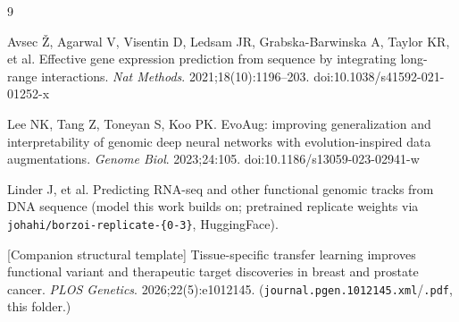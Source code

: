 \documentclass[10pt]{article}
\begin{document}
\begin{thebibliography}{9}

Avsec {\v Z}, Agarwal V, Visentin D, Ledsam JR, Grabska-Barwinska A, Taylor KR, et al.
Effective gene expression prediction from sequence by integrating long-range interactions.
\textit{Nat Methods}. 2021;18(10):1196--203.
doi:10.1038/s41592-021-01252-x

Lee NK, Tang Z, Toneyan S, Koo PK.
EvoAug: improving generalization and interpretability of genomic deep neural networks with evolution-inspired data augmentations.
\textit{Genome Biol}. 2023;24:105.
doi:10.1186/s13059-023-02941-w

Linder J, et al.
Predicting RNA-seq and other functional genomic tracks from DNA sequence (model this work builds on; pretrained replicate weights via \texttt{johahi/borzoi-replicate-\{0-3\}}, HuggingFace).

[Companion structural template] Tissue-specific transfer learning improves functional variant and therapeutic target discoveries in breast and prostate cancer.
\textit{PLOS Genetics}. 2026;22(5):e1012145.
(\texttt{journal.pgen.1012145.xml}/\texttt{.pdf}, this folder.)

\end{thebibliography}
\end{document}
